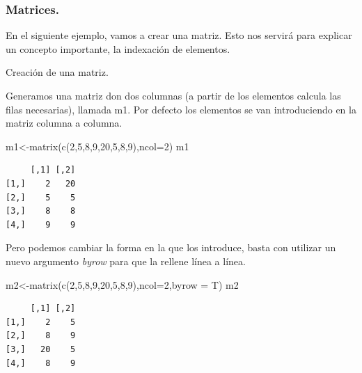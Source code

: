 \documentclass[
  letterpaper,
  DIV=11,
  numbers=noendperiod]{scrreprt}
\newenvironment{Shaded}{\begin{snugshade}}{\end{snugshade}}
\newcommand{\AttributeTok}[1]{\textcolor[rgb]{0.40,0.45,0.13}{#1}}
\newcommand{\DecValTok}[1]{\textcolor[rgb]{0.68,0.00,0.00}{#1}}
\newcommand{\FunctionTok}[1]{\textcolor[rgb]{0.28,0.35,0.67}{#1}}
\newcommand{\NormalTok}[1]{\textcolor[rgb]{0.00,0.23,0.31}{#1}}
\newcommand{\OtherTok}[1]{\textcolor[rgb]{0.00,0.23,0.31}{#1}}
\begin{document}
\hypertarget{matrices.}{%
\subsubsection{Matrices.}\label{matrices.}}

En el siguiente ejemplo, vamos a crear una matriz. Esto nos servirá para
explicar un concepto importante, la indexación de elementos.

Creación de una matriz.

Generamos una matriz don dos columnas (a partir de los elementos calcula
las filas necesarias), llamada m1. Por defecto los elementos se van
introduciendo en la matriz columna a columna.

\begin{Shaded}
\begin{Highlighting}[]
\NormalTok{m1}\OtherTok{\textless{}{-}}\FunctionTok{matrix}\NormalTok{(}\FunctionTok{c}\NormalTok{(}\DecValTok{2}\NormalTok{,}\DecValTok{5}\NormalTok{,}\DecValTok{8}\NormalTok{,}\DecValTok{9}\NormalTok{,}\DecValTok{20}\NormalTok{,}\DecValTok{5}\NormalTok{,}\DecValTok{8}\NormalTok{,}\DecValTok{9}\NormalTok{),}\AttributeTok{ncol=}\DecValTok{2}\NormalTok{) }
\NormalTok{m1}
\end{Highlighting}
\end{Shaded}

\begin{verbatim}
     [,1] [,2]
[1,]    2   20
[2,]    5    5
[3,]    8    8
[4,]    9    9
\end{verbatim}

Pero podemos cambiar la forma en la que los introduce, basta con
utilizar un nuevo argumento \emph{byrow} para que la rellene línea a
línea.

\begin{Shaded}
\begin{Highlighting}[]
\NormalTok{m2}\OtherTok{\textless{}{-}}\FunctionTok{matrix}\NormalTok{(}\FunctionTok{c}\NormalTok{(}\DecValTok{2}\NormalTok{,}\DecValTok{5}\NormalTok{,}\DecValTok{8}\NormalTok{,}\DecValTok{9}\NormalTok{,}\DecValTok{20}\NormalTok{,}\DecValTok{5}\NormalTok{,}\DecValTok{8}\NormalTok{,}\DecValTok{9}\NormalTok{),}\AttributeTok{ncol=}\DecValTok{2}\NormalTok{,}\AttributeTok{byrow =}\NormalTok{ T) }
\NormalTok{m2}
\end{Highlighting}
\end{Shaded}

\begin{verbatim}
     [,1] [,2]
[1,]    2    5
[2,]    8    9
[3,]   20    5
[4,]    8    9
\end{verbatim}
\end{document}
